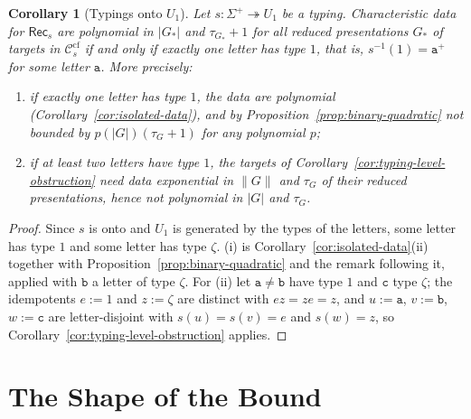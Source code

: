 \documentclass[11pt]{article}
\numberwithin{equation}{section}
\theoremstyle{plain}
\newtheorem{corollary}[theorem]{Corollary}
\theoremstyle{definition}
\theoremstyle{remark}
\theoremstyle{plain}
\newcommand{\cf}{\mathrm{cf}}
\newcommand{\Ccf}[1]{\mathcal C_{#1}^{\cf}}
\newcommand{\Rec}{\mathsf{Rec}}
\begin{document}
\begin{corollary}[Typings onto $U_1$]
\label{cor:u1-classification}
Let $s:\Sigma^+\twoheadrightarrow U_1$ be a typing.  Characteristic data for
$\Rec_s$ are polynomial in $|G_*|$ and $\tau_{G_*}+1$ for all reduced
presentations $G_*$ of targets in $\Ccf{s}$ if and only if exactly one letter has
type $1$, that is, $s^{-1}(1)=\mathtt a^+$ for some letter $\mathtt a$.  More
precisely:
\begin{enumerate}[label=\textup{(\roman*)},leftmargin=*]
\item if exactly one letter has type $1$, the data are polynomial
\textup(Corollary~\ref{cor:isolated-data}\textup), and by
Proposition~\ref{prop:binary-quadratic} not bounded by $p(|G|)(\tau_G+1)$ for any
polynomial $p$;
\item if at least two letters have type $1$, the targets of
Corollary~\ref{cor:typing-level-obstruction} need data exponential in
$\|G\|$ and $\tau_G$ of their reduced presentations, hence not polynomial in
$|G|$ and $\tau_G$.
\end{enumerate}
\end{corollary}

\begin{proof}
Since $s$ is onto and $U_1$ is generated by the types of the letters, some letter
has type $1$ and some letter has type $\zeta$.  (i) is
Corollary~\ref{cor:isolated-data}(ii) together with
Proposition~\ref{prop:binary-quadratic} and the remark following it, applied
with $\mathtt b$ a letter of type $\zeta$.  For (ii) let $\mathtt a\ne\mathtt b$ have
type $1$ and $\mathtt c$ type $\zeta$; the idempotents $e:=1$ and $z:=\zeta$ are
distinct with $ez=ze=z$, and $u:=\mathtt a$, $v:=\mathtt b$, $w:=\mathtt c$ are
letter-disjoint with $s(u)=s(v)=e$ and $s(w)=z$, so
Corollary~\ref{cor:typing-level-obstruction} applies.
\end{proof}

\section{The Shape of the Bound}
\label{sec:shape}
\end{document}
